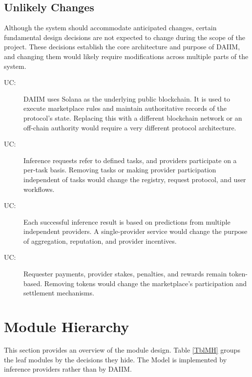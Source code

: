 \documentclass[12pt, titlepage]{article}
\newcounter{ucnum}
\newcommand{\uctheucnum}{UC\theucnum}
\begin{document}
\subsection{Unlikely Changes} \label{SecUchange}

Although the system should accommodate anticipated changes, certain fundamental design decisions are not expected to change during the scope of the project. These decisions establish the core architecture and purpose of DAIIM, and changing them would likely require modifications across multiple parts of the system.

\begin{description}

\item[ \uctheucnum \label{ucBlockchainArchitecture}:] DAIIM uses Solana as the underlying public blockchain. It is used to execute marketplace rules and maintain authoritative records of the protocol's state. Replacing this with a different blockchain network or an off-chain authority would require a very different protocol architecture.

\item[ \uctheucnum \label{ucTaskBasedMarketplace}:] Inference requests refer to defined tasks, and providers participate on a per-task basis. Removing tasks or making provider participation independent of tasks would change the registry, request protocol, and user workflows.

\item[ \uctheucnum \label{ucMultipleProviders}:] Each successful inference result is based on predictions from multiple independent providers. A single-provider service would change the purpose of aggregation, reputation, and provider incentives.

\item[ \uctheucnum \label{ucTokenEconomy}:] Requester payments, provider stakes, penalties, and rewards remain token-based. Removing tokens would change the marketplace's participation and settlement mechanisms.

\end{description}


\section{Module Hierarchy} \label{SecMH}

This section provides an overview of the module design. Table \ref{TblMH}
groups the leaf modules by the decisions they hide. The Model is implemented
by inference providers rather than by DAIIM.
\end{document}
